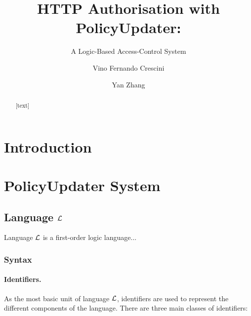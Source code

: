 \documentclass{llncs}
\begin{document}
  \title{HTTP Authorisation with PolicyUpdater:}
  \subtitle{A Logic-Based Access-Control System}

  \author{Vino Fernando Crescini \and Yan Zhang}


  \maketitle

  \begin{abstract}
    [text]
  \end{abstract}

  \section{Introduction}

  \section{PolicyUpdater System}

    \subsection{Language ${\cal L}$}

      Language ${\cal L}$ is a first-order logic language...

      \subsubsection{Syntax}

        \paragraph{Identifiers.}
          As the most basic unit of language ${\cal L}$,
          identifiers are used to represent the different components of the
          language. There are three main classes of identifiers:
\end{document}
